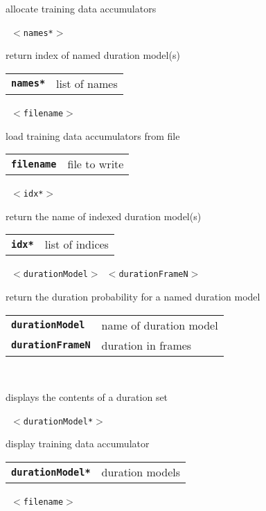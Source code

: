 \begin{description}
\begin{description}
        allocate training data accumulators

       \texttt{ $<$names*$>$} \

        return index of named duration model(s)

      \begin{tabular}{ll}
 \texttt{\textbf{names*}} & list of names \\
      \end{tabular}
       \texttt{ $<$filename$>$} \

        load training data accumulators from file

      \begin{tabular}{ll}
 \texttt{\textbf{filename}} &  file to write  \\
      \end{tabular}
       \texttt{ $<$idx*$>$} \

        return the name of indexed duration model(s)

      \begin{tabular}{ll}
 \texttt{\textbf{idx*}} & list of indices \\
      \end{tabular}
       \texttt{ $<$durationModel$>$ $<$durationFrameN$>$} \

        return the duration probability for a named duration model

      \begin{tabular}{ll}
 \texttt{\textbf{durationModel}} &   name of duration model \\
 \texttt{\textbf{durationFrameN}} &  duration in frames  \\
      \end{tabular}
       \texttt{} \

        displays the contents of a duration set

       \texttt{ $<$durationModel*$>$} \

        display training data accumulator

      \begin{tabular}{ll}
 \texttt{\textbf{durationModel*}} & duration models \\
      \end{tabular}
       \texttt{ $<$filename$>$} \


\end{description}
\end{description}
